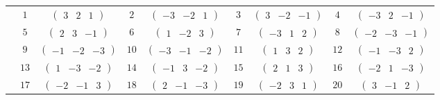 \documentclass[fleqn,10pt,landscape]{article}
\begin{document}
\begin{itemize}
{\begin{center}
\begin{longtable}{ccccccccc}
 & $ 1 $ & $ \begin{pmatrix} 3 & 2 & 1 \end{pmatrix} $ & $ 2 $ & $ \begin{pmatrix} -3 & -2 & 1 \end{pmatrix} $ & $ 3 $ & $ \begin{pmatrix} 3 & -2 & -1 \end{pmatrix} $ & $ 4 $ & $ \begin{pmatrix} -3 & 2 & -1 \end{pmatrix} $ \\
& $ 5 $ & $ \begin{pmatrix} 2 & 3 & -1 \end{pmatrix} $ & $ 6 $ & $ \begin{pmatrix} 1 & -2 & 3 \end{pmatrix} $ & $ 7 $ & $ \begin{pmatrix} -3 & 1 & 2 \end{pmatrix} $ & $ 8 $ & $ \begin{pmatrix} -2 & -3 & -1 \end{pmatrix} $ \\
& $ 9 $ & $ \begin{pmatrix} -1 & -2 & -3 \end{pmatrix} $ & $ 10 $ & $ \begin{pmatrix} -3 & -1 & -2 \end{pmatrix} $ & $ 11 $ & $ \begin{pmatrix} 1 & 3 & 2 \end{pmatrix} $ & $ 12 $ & $ \begin{pmatrix} -1 & -3 & 2 \end{pmatrix} $ \\
& $ 13 $ & $ \begin{pmatrix} 1 & -3 & -2 \end{pmatrix} $ & $ 14 $ & $ \begin{pmatrix} -1 & 3 & -2 \end{pmatrix} $ & $ 15 $ & $ \begin{pmatrix} 2 & 1 & 3 \end{pmatrix} $ & $ 16 $ & $ \begin{pmatrix} -2 & 1 & -3 \end{pmatrix} $ \\
& $ 17 $ & $ \begin{pmatrix} -2 & -1 & 3 \end{pmatrix} $ & $ 18 $ & $ \begin{pmatrix} 2 & -1 & -3 \end{pmatrix} $ & $ 19 $ & $ \begin{pmatrix} -2 & 3 & 1 \end{pmatrix} $ & $ 20 $ & $ \begin{pmatrix} 3 & -1 & 2 \end{pmatrix} $ \\

\end{longtable}
\end{center}}
\end{itemize}
\end{document}
